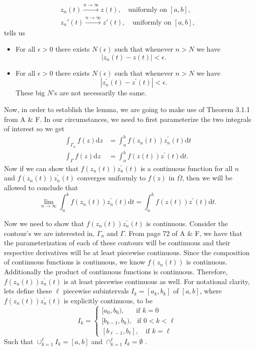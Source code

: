 \documentclass[10pt]{amsart}
\newcommand{\D}{\mathrm{d}}
\theoremstyle{nonumberplain}
\begin{document}
\begin{enumerate}[label={\bf {\arabic*}:}]
\begin{itemize}
\begin{align*}
        z_n(t) \overset{n \to \infty}{\longrightarrow} z(t),  \quad \text{
        uniformly on } [a,b],\\
        z_n'(t) \overset{n \to \infty}{\longrightarrow} z'(t), \quad \text{
        uniformly on } [a,b],
      \end{align*}
tells us
\begin{itemize}
\item For all $\epsilon > 0$ there exists $N(\epsilon)$ such that whenever $n > N$ we have $$|z_n(t) - z(t)| < \epsilon.$$
\item For all $\epsilon > 0$ there exists $N(\epsilon)$ such that whenever $n > N$ we have $$|z_n^\prime(t) - z^\prime(t)| < \epsilon.$$
These big $N$'s are not necessarily the same.
\end{itemize}
\end{itemize}
Now, in order to establish the lemma, we are going to make use of Theorem 3.1.1 from A \& F.
In our circumstances, we need to first parameterize the two integrals of interest so we get
\begin{align*}
\int_{\Gamma_n}  f(z) \D z &= \int_a^b  f(z_n(t))z_n^\prime(t) \D t \\
\int_{\Gamma}  f(z) \D z &= \int_a^b  f(z(t))z^\prime(t) \D t.
\end{align*}
Now if we can show that $f(z_n(t))z_n^\prime(t)$ is a continuous function for all $n$ and $f(z_n(t))z_n^\prime(t)$ converges uniformly to $f(z)$ in $\overline \Omega$, then we will be allowed to conclude that
$$
\lim_{n\rightarrow\infty} \int_a^b  f(z_n(t))z_n^\prime(t) \D t = \int_a^b  f(z(t))z^\prime(t) \D t.
$$

\noindent
Now we need to show that $f(z_n(t))z_n^\prime(t)$ is continuous.
Consider the contour's we are interested in, $\Gamma_n$ and $\Gamma$.
From page 72 of A \& F, we have that the parameterization of each of these contours will be continuous and their respective derivatives will be at least piecewise continuous.
Since the composition of continuous functions is continuous, we know $f(z_n(t))$ is continuous.
Additionally the product of continuous functions is continuous.
Therefore, $f(z_n(t))z_n^\prime(t)$ is at least piecewise continuous as well.
For notational clarity, lets define these $\ell$ piecewise subintervals $I_k = [a_k, b_k]$ of $[a,b]$, where $f(z_n(t))z_n^\prime(t)$ is explicitly continuous, to be
$$
I_k = \begin{cases}
[a_0, b_0), \quad \:\:\: \text{if } k = 0 \\
[b_{k - 1}, b_k), \:\:\: \text{if } 0 < k < \ell \\
[b_{\ell - 1}, b_\ell], \quad \text{if } k = \ell
\end{cases}
$$
Such that $\cup_{k=1}^\ell I_k = [a, b]$ and $\cap_{k=1}^\ell I_k = \emptyset$ .
\\


\end{enumerate}
\end{document}
